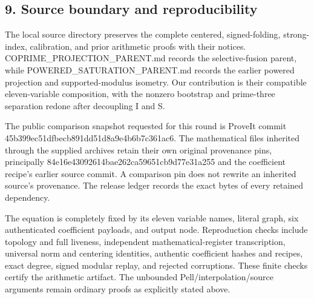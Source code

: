 \subsection*{9. Source boundary and reproducibility}



The local source directory preserves the complete centered, signed-folding, strong-index, calibration, and prior arithmetic proofs with their notices. COPRIME\_\allowbreak{}PROJECTION\_\allowbreak{}PARENT.md records the selective-fusion parent, while POWERED\_\allowbreak{}SATURATION\_\allowbreak{}PARENT.md records the earlier powered projection and supported-modulus isometry. Our contribution is their compatible eleven-variable composition, with the nonzero bootstrap and prime-three separation redone after decoupling I and S.



The public comparison snapshot requested for this round is ProveIt commit 45b399ec\allowbreak{}51dfbecb\allowbreak{}891dd51d\allowbreak{}8a9e4b6b\allowbreak{}7c361ac6. The mathematical files inherited through the supplied archives retain their own original provenance pins, principally 84e16e43\allowbreak{}092614ba\allowbreak{}e262ca59\allowbreak{}651cb9d7\allowbreak{}7e31a255 and the coefficient recipe's earlier source commit. A comparison pin does not rewrite an inherited source's provenance. The release ledger records the exact bytes of every retained dependency.



The equation is completely fixed by its eleven variable names, literal graph, six authenticated coefficient payloads, and output node. Reproduction checks include topology and full liveness, independent mathematical-register transcription, universal norm and centering identities, authentic coefficient hashes and recipes, exact degree, signed modular replay, and rejected corruptions. These finite checks certify the arithmetic artifact. The unbounded Pell/\allowbreak{}interpolation/\allowbreak{}source arguments remain ordinary proofs as explicitly stated above.
